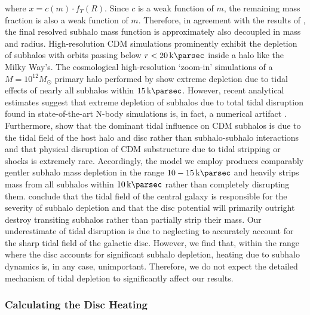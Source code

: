 \documentclass[usenatbib]{mnras}
\begin{document}
where $x = c(m) \cdot f_T(R)$. Since $c$ is a weak function of $m$, the remaining mass fraction is also a weak function of $m$. Therefore, in agreement with the results of \citet{unified_model}, the final resolved subhalo mass function is approximately also decoupled in mass and radius. High-resolution CDM simulations prominently exhibit the depletion of subhalos with orbits passing below $r < \SI{20}{\kilo \parsec}$ inside a halo like the Milky Way's. The cosmological high-resolution `zoom-in' simulations of a $M = 10^{12} M_{\odot}$ primary halo performed by \cite{subhalo_truncation_sims} show extreme depletion due to tidal effects of nearly all subhalos within $\SI{15}{\kilo\parsec}$. However, recent analytical estimates suggest that extreme depletion of subhalos due to total tidal disruption found in state-of-the-art N-body simulations is, in fact, a numerical artifact \citep{dark_matter_substructure_numerics}. Furthermore, \cite{disruption_numerics} show that the dominant tidal influence on CDM subhalos is due to the tidal field of the host halo and disc rather than subhalo-subhalo interactions and that physical disruption of CDM substructure due to tidal stripping or shocks is extremely rare. Accordingly, the model we employ produces comparably gentler subhalo mass depletion in the range $10 - \SI{15}{\kilo \parsec}$ and heavily strips mass from all subhalos within $\SI{10}{\kilo\parsec}$ rather than completely disrupting them. \cite{subhalo_truncation_sims} conclude that the tidal field of the central galaxy is responsible for the severity of subhalo depletion and that the disc potential will primarily outright destroy transiting subhalos rather than partially strip their mass. Our underestimate of tidal disruption is due to neglecting to accurately account for the sharp tidal field of the galactic disc. However, we find that, within the range where the disc accounts for significant subhalo depletion, heating due to subhalo dynamics is, in any case, unimportant. Therefore, we do not expect the detailed mechanism of tidal depletion to significantly affect our results. 

\subsubsection{Calculating the Disc Heating}
\end{document}
